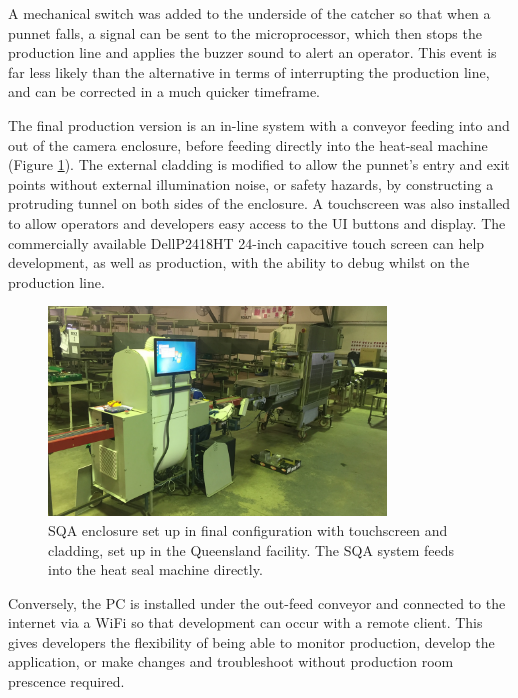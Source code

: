 \documentclass[fleqn,twoside]{article}
\begin{document}
A mechanical switch was added to the underside of the catcher so that when a punnet falls, a signal can be sent to the microprocessor, which then stops the production line and applies the buzzer sound to alert an operator. This event is far less likely than the alternative in terms of interrupting the production line, and can be corrected in a much quicker timeframe.

The final production version is an in-line system with a conveyor feeding into and out of the camera enclosure, before feeding directly into the heat-seal machine (Figure \ref{fig:production_final}). The external cladding is modified to allow the punnet's entry and exit points without external illumination noise, or safety hazards, by constructing a protruding tunnel on both sides of the enclosure. A touchscreen was also installed to allow operators and developers easy access to the UI buttons and display. The commercially available Dell\textregistered P2418HT 24-inch capacitive touch screen can help development, as well as production, with the ability to debug whilst on the production line.


\begin{figure}[ht]
	\centering
	\includegraphics[width=0.8\textwidth]{images/production_final.JPG}
	\caption{SQA enclosure set up in final configuration with touchscreen and cladding, set up in the Queensland facility. The SQA system feeds into the heat seal machine directly.}
	\label{fig:production_final}
\end{figure}

Conversely, the PC is installed under the out-feed conveyor and connected to the internet via a WiFi so that development can occur with a remote client. This gives developers the flexibility of being able to monitor production, develop the application, or make changes and troubleshoot without production room prescence required.
\end{document}
